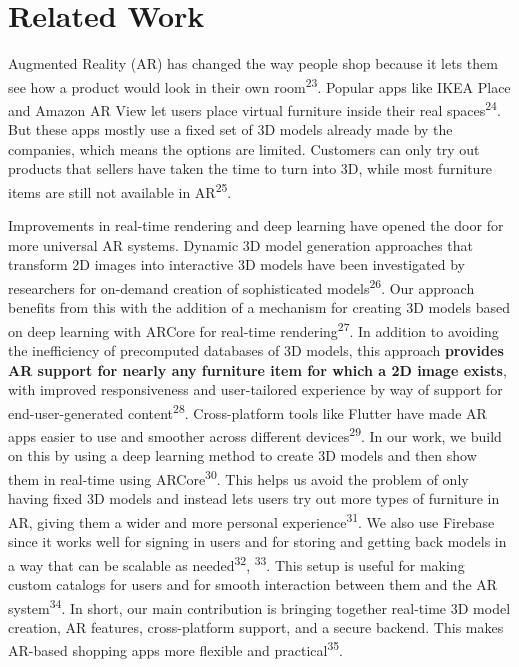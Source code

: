 \documentclass[12pt, a4paper]{article}
\begin{document}
\section{Related Work}

Augmented Reality (AR) has changed the way people shop because it lets them see how a product would look in their own room\textsuperscript{23}. Popular apps like IKEA Place and Amazon AR View let users place virtual furniture inside their real spaces\textsuperscript{24}. But these apps mostly use a fixed set of 3D models already made by the companies, which means the options are limited. Customers can only try out products that sellers have taken the time to turn into 3D, while most furniture items are still not available in AR\textsuperscript{25}.

Improvements in real-time rendering and deep learning have opened the door for more universal AR systems. Dynamic 3D model generation approaches that transform 2D images into interactive 3D models have been investigated by researchers for on-demand creation of sophisticated models\textsuperscript{26}. Our approach benefits from this with the addition of a mechanism for creating 3D models based on deep learning with ARCore for real-time rendering\textsuperscript{27}. In addition to avoiding the inefficiency of precomputed databases of 3D models, this approach \textbf{provides AR support for nearly any furniture item for which a 2D image exists}, with improved responsiveness and user-tailored experience by way of support for end-user-generated content\textsuperscript{28}. Cross-platform tools like Flutter have made AR apps easier to use and smoother across different devices\textsuperscript{29}. In our work, we build on this by using a deep learning method to create 3D models and then show them in real-time using ARCore\textsuperscript{30}. This helps us avoid the problem of only having fixed 3D models and instead lets users try out more types of furniture in AR, giving them a wider and more personal experience\textsuperscript{31}. We also use Firebase since it works well for signing in users and for storing and getting back models in a way that can be scalable as needed\textsuperscript{32}, \textsuperscript{33}. This setup is useful for making custom catalogs for users and for smooth interaction between them and the AR system\textsuperscript{34}. In short, our main contribution is bringing together real-time 3D model creation, AR features, cross-platform support, and a secure backend. This makes AR-based shopping apps more flexible and practical\textsuperscript{35}.
\end{document}

